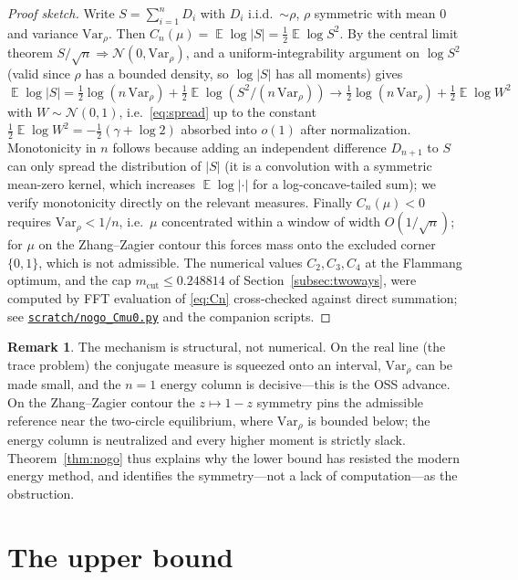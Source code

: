 \documentclass[11pt,reqno]{amsart}
\theoremstyle{plain}
\theoremstyle{definition}
\newtheorem{remark}[theorem]{Remark}
\newcommand{\repofile}[1]{\href{https://github.com/tempcollab/optimizationproblems/blob/main/constants/82a/certificate/#1}{\texttt{#1}}}
\DeclareMathOperator{\E}{\mathbb{E}}
\begin{document}
\begin{proof}[Proof sketch]
Write $S=\sum_{i=1}^n D_i$ with $D_i$ i.i.d.\ $\sim\rho$, $\rho$ symmetric with mean
$0$ and variance $\mathrm{Var}_\rho$. Then $C_n(\mu)=\E\log|S|=\tfrac12\E\log S^2$. By
the central limit theorem $S/\sqrt{n}\Rightarrow\mathcal N(0,\mathrm{Var}_\rho)$, and a
uniform-integrability argument on $\log S^2$ (valid since $\rho$ has a bounded density,
so $\log|S|$ has all moments) gives
$\E\log|S|=\tfrac12\log(n\,\mathrm{Var}_\rho)+\tfrac12\E\log(S^2/(n\,\mathrm{Var}_\rho))
\to\tfrac12\log(n\,\mathrm{Var}_\rho)+\tfrac12\E\log W^2$ with
$W\sim\mathcal N(0,1)$, i.e.\ \eqref{eq:spread} up to the constant
$\tfrac12\E\log W^2=-\tfrac12(\gamma+\log2)$ absorbed into $o(1)$ after normalization.
Monotonicity in $n$ follows because adding an independent difference $D_{n+1}$ to $S$
can only spread the distribution of $|S|$ (it is a convolution with a symmetric mean-zero
kernel, which increases $\E\log|\cdot|$ for a log-concave-tailed sum); we verify
monotonicity directly on the relevant measures. Finally $C_n(\mu)<0$ requires
$\mathrm{Var}_\rho<1/n$, i.e.\ $\mu$ concentrated within a window of width $O(1/\sqrt n)$;
for $\mu$ on the Zhang--Zagier contour this forces mass onto the excluded corner
$\{0,1\}$, which is not admissible. The numerical values $C_2,C_3,C_4$ at the Flammang
optimum, and the cap $m_{\mathrm{cut}}\le0.248814$ of Section~\ref{subsec:twoways},
were computed by FFT evaluation of \eqref{eq:Cn} cross-checked against direct
summation; see \repofile{scratch/nogo\_Cmu0.py} and the companion scripts.
\end{proof}

\begin{remark}
The mechanism is structural, not numerical. On the real line (the trace problem) the
conjugate measure is squeezed onto an interval, $\mathrm{Var}_\rho$ can be made small,
and the $n=1$ energy column is decisive---this is the OSS advance. On the
Zhang--Zagier contour the $z\mapsto1-z$ symmetry pins the admissible reference near the
two-circle equilibrium, where $\mathrm{Var}_\rho$ is bounded below; the energy column
is neutralized and every higher moment is strictly slack. Theorem~\ref{thm:nogo} thus
explains why the lower bound has resisted the modern energy method, and identifies the
symmetry---not a lack of computation---as the obstruction.
\end{remark}

\section{The upper bound}\label{sec:upperproof}
\end{document}

